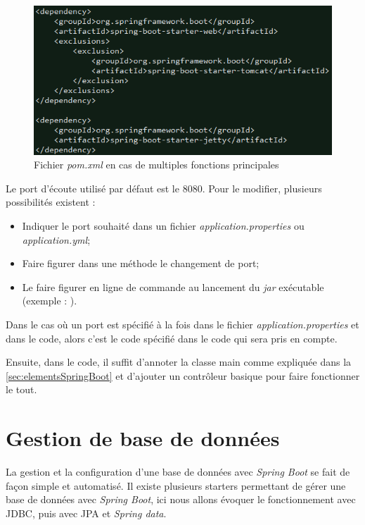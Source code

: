 \documentclass{polytech/polytech}
\begin{document}
\begin{figure}
	\includegraphics[scale=0.8]{images/webBuildSpringBoot}
	\caption{Fichier \textit{pom.xml} en cas de multiples fonctions principales}
	\label{fig:webBuildSpringBoot}
\end{figure}

Le port d’écoute utilisé par défaut est le 8080. Pour le modifier, plusieurs possibilités existent :

\begin{itemize}
	\item Indiquer le port souhaité dans un fichier \textit{application.properties} ou \textit{application.yml};
	\item Faire figurer dans une méthode le changement de port;
	\item Le faire figurer en ligne de commande au lancement du \textit{jar} exécutable (exemple : ).
\end{itemize}

Dans le cas où un port est spécifié à la fois dans le fichier \textit{application.properties} et dans le code, alors c’est le code spécifié dans le code qui sera pris en compte.

Ensuite, dans le code, il suffit d’annoter la classe main comme expliquée dans la \autoref{sec:elementsSpringBoot} et d’ajouter un contrôleur basique pour faire fonctionner le tout. 

\section{Gestion de base de données}

La gestion et la configuration d’une base de données avec \textit{Spring Boot} se fait de façon simple et automatisé. Il existe plusieurs starters permettant de gérer une base de données avec \textit{Spring Boot}, ici nous allons évoquer le fonctionnement avec JDBC, puis avec JPA et \textit{Spring data}.
\end{document}
